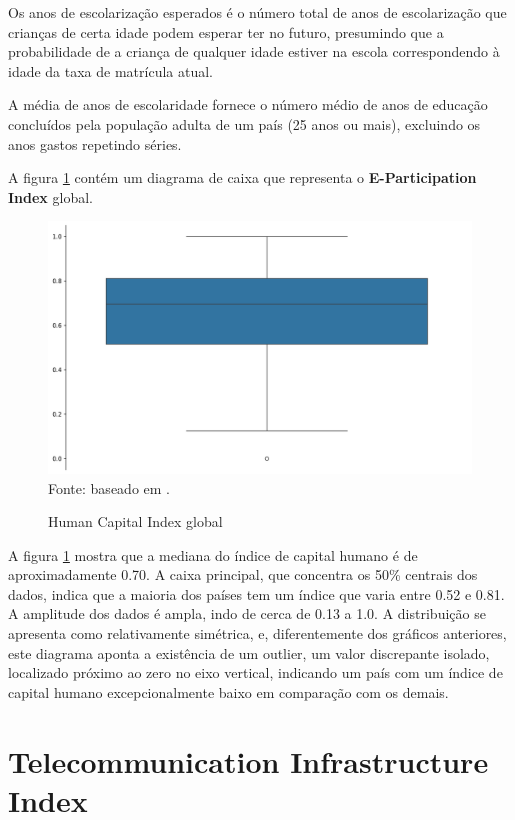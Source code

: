 Os anos de escolarização esperados é o número total de anos de escolarização que crianças de certa idade podem esperar ter no futuro, presumindo que a probabilidade de a criança de qualquer idade estiver na escola correspondendo à idade da taxa de matrícula atual.

A média de anos de escolaridade fornece o número médio de anos de educação concluídos pela população adulta de um país (25 anos ou mais), excluindo os anos gastos repetindo séries. 

A figura \ref{fig:boxplot_hci_global} contém um diagrama de caixa que representa o \textbf{E-Participation Index} global.

\begin{figure}[H]
	\centering
	\caption{Human Capital Index global}
	\includegraphics[width=1\linewidth]{figuras/egdi/boxplot_hci_global.png}
	\label{fig:boxplot_hci_global}
	\footnotesize{Fonte: baseado em \cite{ONU_EGDI_mapa}.}
\end{figure}

A figura \ref{fig:boxplot_hci_global} mostra que a mediana do índice de capital humano é de aproximadamente 0.70. A caixa principal, que concentra os 50\% centrais dos dados, indica que a maioria dos países tem um índice que varia entre 0.52 e 0.81. A amplitude dos dados é ampla, indo de cerca de 0.13 a 1.0. A distribuição se apresenta como relativamente simétrica, e, diferentemente dos gráficos anteriores, este diagrama aponta a existência de um outlier, um valor discrepante isolado, localizado próximo ao zero no eixo vertical, indicando um país com um índice de capital humano excepcionalmente baixo em comparação com os demais.

\section{Telecommunication Infrastructure Index}
\label{tii}

